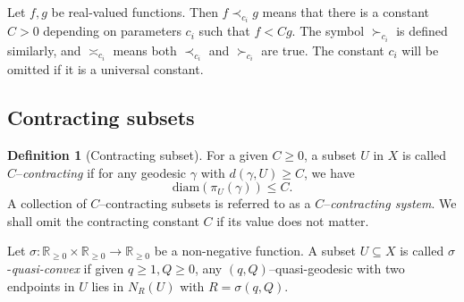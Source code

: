 \documentclass{amsart}
\theoremstyle{definition}
\newtheorem{defn}[thm]{Definition}
\theoremstyle{remark}
\newcommand{\U}{ X}
\newcommand{\from}{\colon\thinspace}
\newcommand{\go}{{o}}
\begin{document}







Let $f, g$ be real-valued functions. Then $f \prec_{c_i} g$ means that
there is a constant $C >0$ depending on parameters $c_i$ such that
$f < Cg$. The symbol $\succ_{c_i}  $ is defined similarly, and  $\asymp_{c_i}$ means both $\prec_{c_i}  $ and $\succ_{c_i}  $  are true. The constant $c_i$ will be omitted if it is a universal constant.

\subsection{Contracting subsets}
\begin{defn}[Contracting subset]
For a given $C\ge 0$, a subset $U$ in $\U$ is called $C$--\textit{contracting}   if for any geodesic $\gamma$ with $d(\gamma,
U) \ge C$, we have
$$\mathrm{diam}(\pi_{U} (\gamma)) \le C.$$
 A
collection of $C$--contracting subsets is referred to
as a $C$--\textit{contracting system}. We shall omit the contracting constant $C$ if its value does not matter.
\end{defn}
 
 


 
Let $\sigma: \mathbb R_{\ge 0}\times \mathbb R_{\ge 0} \to \mathbb R_{\ge 0}$ be a non-negative function.
A subset $U\subseteq\U$ is called $\sigma$-\textit{quasi-convex} if  given $q\ge 1, Q\ge 0$,  any $(q, Q)$--quasi-geodesic with two endpoints in $U$ lies in $N_{R}(U)$ with $R=\sigma(q,Q)$.
\end{document}
